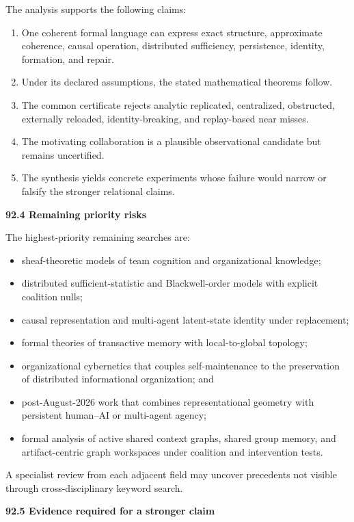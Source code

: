 \documentclass[11pt,letterpaper]{article}
\newcommand{\subtopic}[1]{%
 \vspace{0.45em}
 {\bfseries\color{AccentColor} #1\par}
}
\theoremstyle{plain}
\theoremstyle{definition}
\begin{document}
The analysis supports the following claims:
\begin{enumerate}
\item One coherent formal language can express exact structure, approximate
 coherence, causal operation, distributed sufficiency, persistence,
 identity, formation, and repair.
\item Under its declared assumptions, the stated mathematical theorems follow.
\item The common certificate rejects analytic replicated, centralized,
 obstructed, externally reloaded, identity-breaking, and replay-based
 near misses.
\item The motivating collaboration is a plausible observational candidate but
 remains uncertified.
\item The synthesis yields concrete experiments whose failure would narrow or
 falsify the stronger relational claims.
\end{enumerate}

\subtopic{92.4 Remaining priority risks}

The highest-priority remaining searches are:
\begin{itemize}
\item sheaf-theoretic models of team cognition and organizational knowledge;
\item distributed sufficient-statistic and Blackwell-order models with
 explicit coalition nulls;
\item causal representation and multi-agent latent-state identity under
 replacement;
\item formal theories of transactive memory with local-to-global topology;
\item organizational cybernetics that couples self-maintenance to the
 preservation of distributed informational organization; and
\item post-August-2026 work that combines representational geometry with
 persistent human--AI or multi-agent agency;
\item formal analysis of active shared context graphs, shared group memory, and
 artifact-centric graph workspaces under coalition and intervention tests.
\end{itemize}
A specialist review from each adjacent field may uncover precedents not visible
through cross-disciplinary keyword search.

\subtopic{92.5 Evidence required for a stronger claim}
\end{document}
